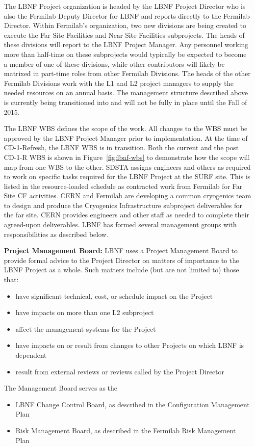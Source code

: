 The LBNF Project organization is headed by the LBNF Project Director who is also the Fermilab Deputy Director for LBNF and reports directly to the Fermilab Director. 
Within Fermilab's organization, two new divisions are being created to execute the Far Site Facilities and Near Site Facilities subprojects. The heads of these divisions will report to the LBNF Project Manager. 
Any personnel working more than half-time on these subprojects would typically be expected to become a member of one of these divisions, while other contributors will likely be matrixed in part-time roles from other Fermilab Divisions.  The heads of the other Fermilab Divisions work with the L1 and L2 project managers to supply the needed resources on an annual basis.  The management structure described above is currently being transitioned into and will not be fully in place until the Fall of 2015.  

The LBNF WBS defines the scope of the work. All changes to the WBS must be approved by the LBNF Project Manager prior to implementation. At the time of CD-1-Refresh, the LBNF WBS is in transition. Both the current and the post CD-1-R WBS is shown in Figure~\ref{fig:lbnf-wbs} to demonstrate how the scope will map from one WBS to the other. 
SDSTA assigns engineers and others as required to work on specific tasks required for the LBNF Project at the SURF site. This is listed in the resource-loaded schedule as contracted work from Fermilab for Far Site CF activities. 
CERN and Fermilab are developing a common cryogenics team to design and produce the Cryogenics Infrastructure subproject deliverables for the far site. CERN provides engineers and other staff as needed to complete their agreed-upon deliverables.  
LBNF has formed several management groups with responsibilities as described below.

\textbf{Project Management Board:} LBNF uses a Project Management Board to provide formal advice to the Project Director on matters of importance to the LBNF Project as a whole. Such matters include (but are not limited to) those that:
\begin{itemize}
\item have significant technical, cost, or schedule impact on the Project
\item have impacts on more than one L2 subproject
\item affect the management systems for the Project
\item have impacts on or result from changes to other Projects on which LBNF is dependent
\item result from external reviews or reviews called by the Project Director
\end{itemize}
The Management Board serves as the
\begin{itemize}
\item LBNF Change Control Board, as described in the Configuration Management Plan \fixme{[ref]}
\item Risk Management Board, as described in the Fermilab Risk Management Plan  \fixme{[ref]}
\end{itemize}

